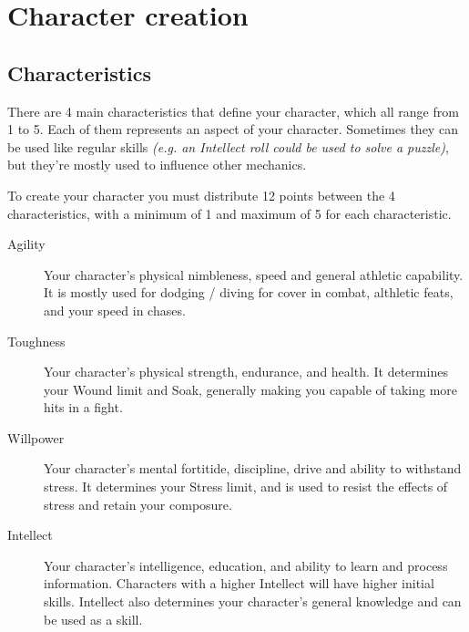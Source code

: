 \chapter{Character creation}

\section{Characteristics}


There are 4 main characteristics that define your character, which all range from 1 to 5. 
Each of them represents an aspect of your character. Sometimes they can be used like regular skills \textit{(e.g. an Intellect roll could be used to solve a puzzle)}, 
but they're mostly used to influence other mechanics. 

To create your character you must distribute 12 points between the 4 characteristics, 
with a minimum of 1 and maximum of 5 for each characteristic.

\begin{description}
    \item[Agility] 
    Your character's physical nimbleness, speed and general athletic capability.
    It is mostly used for dodging / diving for cover in combat, althletic feats, and your speed in chases.

    \item[Toughness] 
    Your character's physical strength, endurance, and health.
    It determines your Wound limit and Soak, generally making you capable of taking more hits in a fight.

    \item[Willpower]
    Your character's mental fortitide, discipline, drive and ability to withstand stress.
    It determines your Stress limit, and is used to resist the effects of stress and retain your composure.
    
    \item[Intellect]
    Your character's intelligence, education, and ability to learn and process information.
    Characters with a higher Intellect will have higher initial skills. 
    Intellect also determines your character's general knowledge and can be used as a skill.
\end{description}

